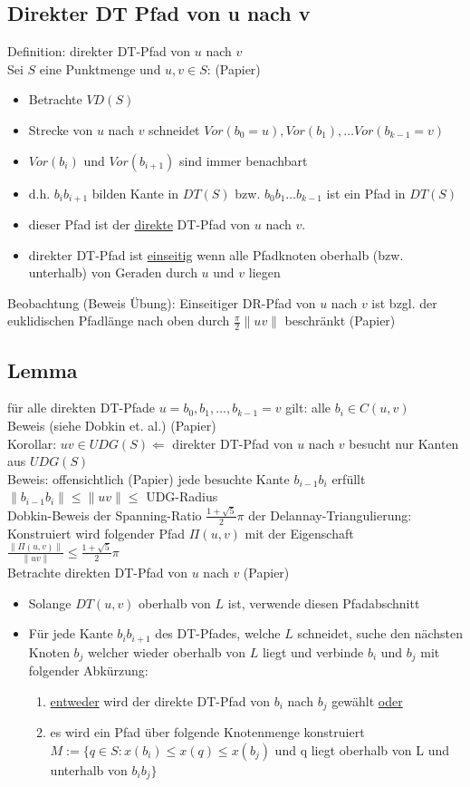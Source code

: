 \documentclass{article}
\begin{document}
\subsection*{Direkter DT Pfad von u nach v}
Definition: direkter DT-Pfad von $u$ nach $v$\\
Sei $S$ eine Punktmenge und $u,v \in S$: (Papier)
\begin{itemize}
	\item Betrachte $VD(S)$
	\item Strecke von $u$ nach $v$ schneidet $Vor(b_0=u), Vor(b_1), \ldots
	Vor(b_{k-1}=v)$
	\item $Vor(b_i)$ und $Vor(b_{i+1})$ sind immer benachbart
	\item d.h. $b_ib_{i+1}$ bilden Kante in $DT(S)$ bzw. $b_0b_1 \ldots
	b_{k-1}$ ist ein Pfad in $DT(S)$
	\item dieser Pfad ist der \underline{direkte} DT-Pfad von $u$ nach $v$.
	\item direkter DT-Pfad ist \underline{einseitig} wenn alle Pfadknoten
	oberhalb (bzw. unterhalb) von Geraden durch $u$ und $v$ liegen
\end{itemize}
Beobachtung (Beweis Übung): Einseitiger DR-Pfad von $u$ nach $v$ ist
bzgl. der euklidischen Pfadlänge nach oben durch $\displaystyle
\frac{\pi}{2}\|uv\|$ beschränkt (Papier) \\
\subsection*{Lemma}
für alle direkten DT-Pfade $u=b_0,b_1,\ldots,b_{k-1}=v$ gilt:
alle $b_i \in C(u,v)$\\ Beweis (siehe Dobkin et. al.) (Papier) \\
Korollar: $uv \in UDG(S) \Leftarrow$ direkter DT-Pfad von $u$ nach $v$
besucht nur Kanten aus
 $UDG(S)$\\
  Beweis: offensichtlich (Papier) jede
besuchte Kante $b_{i-1}b_i$ erfüllt $\|b_{i-1}b_i\| \leq \|uv\| \leq$
UDG-Radius \\
Dobkin-Beweis der Spanning-Ratio $\displaystyle \frac{1+\sqrt{5}}{2}\pi$
der Delannay-Triangulierung: Konstruiert wird folgender Pfad $\Pi(u,v)$
mit der Eigenschaft $\displaystyle \frac{\|\Pi(u,v)\|}{\|uv\|} \leq
\frac{1+\sqrt{5}}{2}\pi$ \\
Betrachte direkten DT-Pfad von $u$ nach $v$ (Papier)
\begin{itemize}
	\item Solange $DT(u,v)$ oberhalb von $L$ ist, verwende diesen Pfadabschnitt
	\item Für jede Kante $b_ib_{i+1}$ des DT-Pfades, welche $L$ schneidet,
	suche den nächsten Knoten $b_j$ welcher wieder oberhalb von $L$ liegt
	und verbinde $b_i$ und $b_j$ mit folgender Abkürzung: \begin{enumerate}
		\item \underline{entweder} wird der direkte DT-Pfad von $b_i$ nach $b_j$
		gewählt \underline{oder}
		\item es wird ein Pfad über folgende Knotenmenge konstruiert $M :=
		\{q\in S : x(b_i) \leq x(q) \leq x(b_j)$ und q liegt oberhalb von L und
		unterhalb von $b_ib_j\}$
	\end{enumerate}
\end{itemize}
\end{document}
